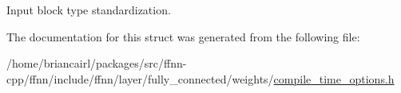 Input block type standardization. 



The documentation for this struct was generated from the following file\-:\begin{DoxyCompactItemize}
\item 
/home/briancairl/packages/src/ffnn-\/cpp/ffnn/include/ffnn/layer/fully\-\_\-connected/weights/\hyperlink{fully__connected_2weights_2compile__time__options_8h}{compile\-\_\-time\-\_\-options.\-h}\end{DoxyCompactItemize}
